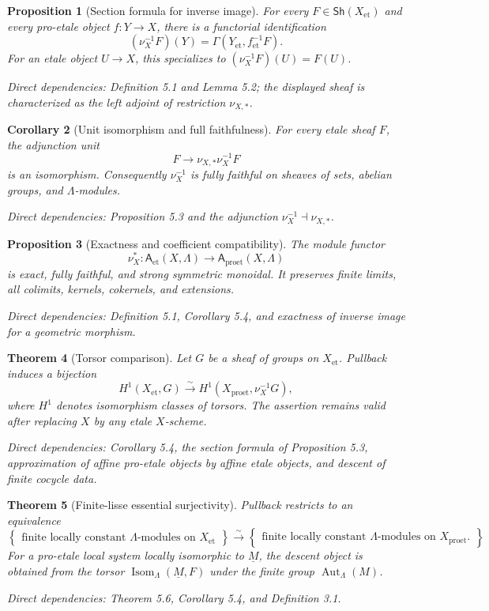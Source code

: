 \documentclass[10pt]{article}
\newtheorem{theorem}{Theorem}[section]
\newtheorem{proposition}[theorem]{Proposition}
\newtheorem{corollary}[theorem]{Corollary}
\theoremstyle{definition}
\newcommand{\Lam}{\Lambda}
\newcommand{\Sh}{\mathsf{Sh}}
\newcommand{\et}{\mathrm{et}}
\newcommand{\proet}{\mathrm{proet}}
\newcommand{\dep}[1]{\par\smallskip\noindent\textit{Direct dependencies: #1}}
\begin{document}
\begin{proposition}[Section formula for inverse image]
For every $F\in\Sh(X_\et)$ and every pro-etale object $f:Y\to X$, there is a
functorial identification
\[
(\nu_X^{-1}F)(Y)=\Gamma(Y_\et,f_\et^{-1}F).
\]
For an etale object $U\to X$, this specializes to
$(\nu_X^{-1}F)(U)=F(U)$.
\dep{Definition 5.1 and Lemma 5.2; the displayed sheaf is characterized as the
left adjoint of restriction $\nu_{X,*}$.}
\end{proposition}

\begin{corollary}[Unit isomorphism and full faithfulness]
For every etale sheaf $F$, the adjunction unit
\[
F\longrightarrow\nu_{X,*}\nu_X^{-1}F
\]
is an isomorphism.  Consequently $\nu_X^{-1}$ is fully faithful on sheaves of
sets, abelian groups, and $\Lam$-modules.
\dep{Proposition 5.3 and the adjunction $\nu_X^{-1}\dashv\nu_{X,*}$.}
\end{corollary}

\begin{proposition}[Exactness and coefficient compatibility]
The module functor
\[
\nu_X^*: \mathsf A_\et(X,\Lam)
\longrightarrow\mathsf A_\proet(X,\Lam)
\]
is exact, fully faithful, and strong symmetric monoidal.  It preserves finite
limits, all colimits, kernels, cokernels, and extensions.
\dep{Definition 5.1, Corollary 5.4, and exactness of inverse image for a
geometric morphism.}
\end{proposition}

\begin{theorem}[Torsor comparison]
Let $G$ be a sheaf of groups on $X_\et$.  Pullback induces a bijection
\[
H^1(X_\et,G)\xrightarrow{\sim}
H^1(X_\proet,\nu_X^{-1}G),
\]
where $H^1$ denotes isomorphism classes of torsors.  The assertion remains
valid after replacing $X$ by any etale $X$-scheme.
\dep{Corollary 5.4, the section formula of Proposition 5.3, approximation of
affine pro-etale objects by affine etale objects, and descent of finite cocycle
data.}
\end{theorem}

\begin{theorem}[Finite-lisse essential surjectivity]
Pullback restricts to an equivalence
\[
\left\{\begin{array}{c}
\text{finite locally constant $\Lam$-modules on }X_\et
\end{array}\right\}
\xrightarrow{\ \sim\ }
\left\{\begin{array}{c}
\text{finite locally constant $\Lam$-modules on }X_\proet.
\end{array}\right\}
\]
For a pro-etale local system locally isomorphic to $\underline M$, the descent
object is obtained from the torsor
$\operatorname{Isom}_\Lam(\underline M,F)$ under the finite group
$\operatorname{Aut}_\Lam(M)$.
\dep{Theorem 5.6, Corollary 5.4, and Definition 3.1.}
\end{theorem}
\end{document}
